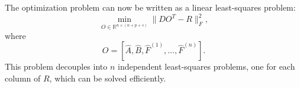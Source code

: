 \documentclass{article}
\begin{document}
The optimization problem can now be written as a linear least-squares problem:
\begin{equation}
    \min_{O \in \mathbb{R}^{n \times (n+p+s)}} \| D O^T - R \|_F^2,
\end{equation}
where
\[
    O = [\hat{A}, \hat{B}, \hat{F}^{(1)}, \dots, \hat{F}^{(n)}].
\]
This problem decouples into $n$ independent least-squares problems, 
one for each column of $R$, which can be solved efficiently.

\vspace{1cm}


\vspace{1cm}


\vspace{1cm}

\vspace{1cm}

\vspace{1cm}

\vspace{1cm}

\vspace{1cm}

\vspace{1cm}
\end{document}

